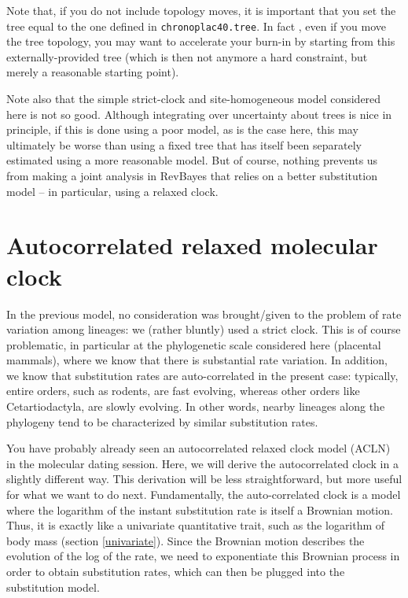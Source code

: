 \documentclass[usletter]{article}
\newcommand{\cmd}[1]{\texttt{#1}}
\begin{document}
Note that, if you do not include topology moves, it is important that you 
set the tree equal to the one defined in \cmd{chronoplac40.tree}.
In fact , even if you move the tree topology,
you may want to accelerate your burn-in by starting from this externally-provided tree
(which is then not anymore a hard constraint, but merely a reasonable starting point).

Note also that the simple strict-clock and site-homogeneous model considered here is not so good.
Although integrating over uncertainty about trees is nice in principle,
if this is done using a poor model, as is the case here,
this may ultimately be worse than using a fixed tree that has itself been separately estimated using a more reasonable model.
But of course, nothing prevents us from making a joint analysis in RevBayes
that relies on a better substitution model -- in particular, using a relaxed clock.

\section{Autocorrelated relaxed molecular clock}

In the previous model, no consideration was brought/given to the problem of rate variation among lineages: we (rather bluntly) used a strict clock. This is of course problematic, in particular at the phylogenetic scale considered here (placental mammals), where we know that there is substantial rate variation. In addition, we know that substitution rates are auto-correlated in the present case: typically, entire orders, such as rodents, are fast evolving, whereas other orders like Cetartiodactyla, are slowly evolving. In other words, nearby lineages along the phylogeny tend to be characterized by similar substitution rates.

You have probably already seen an autocorrelated relaxed clock model (ACLN) in the molecular dating session. Here, we will derive the autocorrelated clock in a slightly different way. This derivation will be less straightforward, but more useful for what we want to do next.
Fundamentally, the auto-correlated clock is a model where the logarithm of the instant substitution rate is itself a Brownian motion. Thus, it is exactly like a univariate quantitative trait, such as the logarithm of body mass (section \ref{univariate}). Since the Brownian motion describes the evolution of the log of the rate, we need to exponentiate this Brownian process in order to obtain substitution rates, which can then be plugged into the substitution model.
\end{document}

